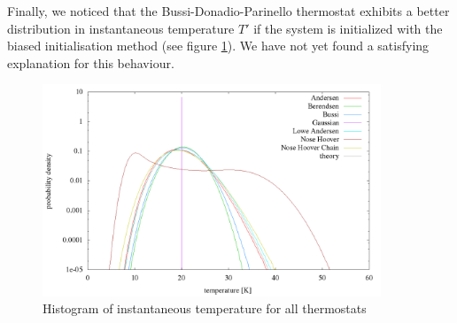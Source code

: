 Finally, we noticed that the Bussi-Donadio-Parinello thermostat exhibits a better distribution in instantaneous temperature $T'$ if the system is initialized with the biased initialisation method (see figure \ref{im:temp_one}). We have not yet found a satisfying explanation for this behaviour. 


\begin{figure}[H]
\centering
\includegraphics[width=0.9\textwidth]{./graphics/Histogramm_tempCol_one_T=20_p=64.png}
\caption{Histogram of instantaneous temperature for all thermostats}
\label{im:temp_one}
\end{figure}

